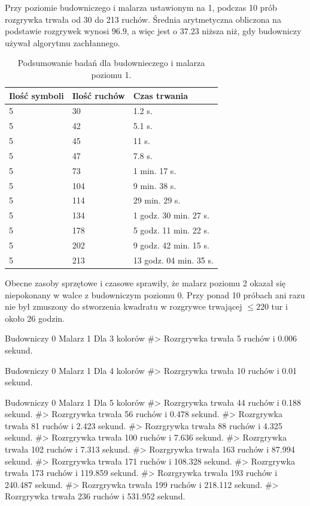 \documentclass[document]{xmgr}
\begin{document}
\hfill \break
\hfill \break
\hfill \break
\hfill \break
\hfill \break
\hfill \break
\hfill \break
\hfill \break
\hfill \break
\hfill \break
\hfill \break
\hfill \break
Przy poziomie budowniczego i malarza ustawionym na 1, podczas 10 prób rozgrywka trwała od 30 do 213 ruchów. Średnia arytmetyczna obliczona na podstawie rozgrywek wynosi $96.9$, a więc jest o $37.23$ niższa niż, gdy budowniczy używał algorytmu zachłannego. 

\begin{table}[!h]
	\begin{tabular}{|l|l|l|} \hline
	Ilość symboli & Ilość ruchów & Czas trwania \\ \hline
	5 & 30 & 1.2 s. \\ \hline	
	5 & 42 & 5.1 s. \\ \hline
	5 & 45 & 11 s. \\ \hline	
	5 & 47 & 7.8 s. \\ \hline
	5 & 73 & 1 min. 17 s. \\ \hline
	5 & 104 & 9 min. 38 s. \\ \hline
	5 & 114 & 29 min. 29 s. \\ \hline
	5 & 134 & 1 godz. 30 min. 27 s.  \\ \hline
	5 & 178 & 5 godz. 11 min. 22 s. \\ \hline
	5 & 202 & 9 godz. 42 min. 15 s. \\ \hline
	5 & 213 & 13 godz. 04 min. 35 s. \\ \hline
	\end{tabular}
	\caption{Podsumowanie badań dla budownieczego i malarza poziomu 1.}
	\label{fig:builder1Painter1Table}
\end{table}


Obecne zasoby sprzętowe i czasowe sprawiły, że malarz poziomu 2 okazał się niepokonany w walce z budowniczym poziomu 0. Przy ponad 10 próbach ani razu nie był zmuszony do stworzenia kwadratu w rozgrywce trwającej $\leq 220$ tur i około 26 godzin.





\iffalse
Budowniczy 0
Malarz 1
Dla 3 kolorów 
#> Rozrgrywka trwała 5 ruchów i 0.006 sekund.

Budowniczy 0
Malarz 1
Dla 4 kolorów
#> Rozrgrywka trwała 10 ruchów i 0.01 sekund.

Budowniczy 0
Malarz 1
Dla 5 kolorów
#> Rozrgrywka trwała 44 ruchów i 0.188 sekund.
#> Rozrgrywka trwała 56 ruchów i 0.478 sekund.
#> Rozrgrywka trwała 81 ruchów i 2.423 sekund.
#> Rozrgrywka trwała 88 ruchów i 4.325 sekund.
#> Rozrgrywka trwała 100 ruchów i 7.636 sekund.
#> Rozrgrywka trwała 102 ruchów i 7.313 sekund.
#> Rozrgrywka trwała 163 ruchów i 87.994 sekund.
#> Rozrgrywka trwała 171 ruchów i 108.328 sekund.
#> Rozrgrywka trwała 173 ruchów i 119.859 sekund.
#> Rozrgrywka trwała 193 ruchów i 240.487 sekund.
#> Rozrgrywka trwała 199 ruchów i 218.112 sekund.
#> Rozrgrywka trwała 236 ruchów i 531.952 sekund.
\end{document}
